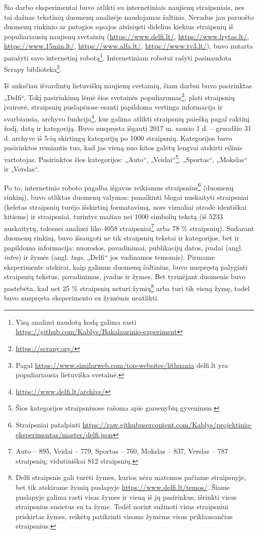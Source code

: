 \documentclass{VUMIFInfBakalaurinis}
\begin{document}
Šio darbo eksperimentai buvo atlikti su internetiniais naujienų
straipsniais, nes tai dažnas tekstinių duomenų analizėje naudojamas
šaltinis. Neradus jau paruošto duomenų
rinkinio ar patogios sąsajos atsisiųsti didelius kiekius straipsnių iš
populiariausių naujienų svetainių
(\url{https://www.delfi.lt/}, \url{https://www.lrytas.lt/},
\url{https://www.15min.lt/}, \url{https://www.alfa.lt/},
\url{https://www.tv3.lt/}), buvo nutarta
parašyti savo internetinį robotą\footnote{Visą analizei naudotą kodą galima rasti \url{https://github.com/Kablys/Bakalaurinio-experiment}}.
Internetiniam robotui rašyti pasinaudota Scrapy biblioteka\footnote{\url{https://scrapy.org/}}.

Iš anksčiau išvardintų lietuviškų naujienų svetainių, šiam darbui buvo
pasirinktas „Delfi“. Tokį pasirinkimą lėmė šios svetainės
populiarumas\footnote{Pagal
  \url{https://www.similarweb.com/top-websites/lithuania}
  delfi.lt yra populiariausia lietuviška svetainė.}, plati straipsnių
įvairovė, straipsnių puslapiuose esanti papildoma vertinga informacija
ir svarbiausia, archyvo funkcija\footnote{\url{https://www.delfi.lt/archive/}},
kur galima atlikti straipsnių paiešką pagal raktinį žodį, datą ir
kategoriją. Buvo nuspręsta išgauti 2017 m. sausio 1 d. -- gruodžio 31 d.
archyve iš 5-ių skirtingų kategorijų po 1000 straipsnių. Kategorijos
buvo pasirinktos remiantis tuo, kad jas vieną nuo kitos
galėtų lengvai atskirti eilinis vartotojas. Pasirinktos šios
kategorijos: „Auto“, „Veidai“\footnote{Šios kategorijos straipsniuose
  rašoma apie garsenybių gyvenimus.}, „Sportas“, „Mokslas“ ir
„Verslas“.

Po to, internetinio roboto pagalba išgavus reikiamus
straipsnius\footnote{Straipsniai patalpinti
  \url{https://raw.githubusercontent.com/Kablys/projektinio-eksperimentas/master/delfi.json}}
(duomenų rinkinį), buvo atliktas duomenų valymas: panaikinti blogai
nuskaityti straipsniai (keletas straipsnių turėjo išskirtinį
formatavimą, nors vizualiai atrodė identiškai kitiems) ir straipsniai,
turintys mažiau nei 1000 simbolių tekstą (iš 5233 nuskaitytų, tolesnei
analizei liko 4058 straipsniai\footnote{Auto -- 895, Veidai -- 779,
  Sportas -- 760, Mokslas -- 837, Verslas -- 787 straipsnių;
  vidutiniškai 812 straipsnių.} arba 78 \% straipsnių). Sudarant duomenų
rinkinį, buvo išsaugoti ne tik straipsnių tekstai ir kategorijos, bet ir
papildoma informacija: nuorodos, pavadinimai, publikacijų datos, įvadai
(angl. \emph{intro}) ir žymės (angl. \emph{tags}, „Delfi“ jos vadinamos
temomis). Pirmame eksperimente atskirai, kaip galimus duomenų šaltinius,
buvo nuspręstą palyginti straipsnių tekstus, pavadinimus, įvadus ir
žymes. Bet tyrinėjant duomenis buvo pastebėta, kad net 25 \% straipsnių
neturi žymių\footnote{Delfi straipsnis gali turėti žymes, kurios nėra
  matomos pačiame straipsnyje, bet tik atskirame žymių puslapyje
  \url{https://www.delfi.lt/temos/}.
  Šiame puslapyje galima rasti visas žymes ir vieną iš jų pasirinkus,
  išrinkti visus straipsnius susietus su ta žyme. Todėl norint sužinoti
  visas straipsniui priskirtas žymes, reikėtų patikrinti visoms žymėms
  visus priklausančius straipsnius.} arba turi tik vieną žymę, todėl
buvo nuspręsta eksperimento su žymėmis neatlikti.
\end{document}
